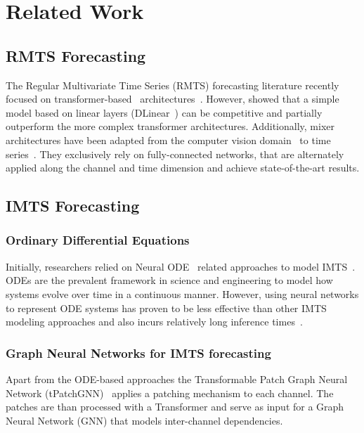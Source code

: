 \section{Related Work}
\subsection{RMTS Forecasting}
The Regular Multivariate Time Series (RMTS) forecasting literature recently focused on transformer-based~\cite{Vaswani2017.Attention} architectures~\cite{Zhou2021.Informer, Wu2021.Autoformer,Zhou2022.FEDformer,Nie2022.Time,Liu2023.ITransformer}. 
However, \citeauthor{Zeng2023.Are} showed that a simple model based on linear layers (DLinear~\cite{Zeng2023.Are}) can be competitive and partially outperform the more complex transformer architectures. 
Additionally, mixer architectures have been adapted from the computer vision domain~\cite{Tolstikhin2021.MLPMixer} to time series~\cite{Ekambaram2023.TSMixer,Chen2023.TSMixer}.
They exclusively rely on fully-connected networks, that are alternately applied along the channel and time dimension and achieve state-of-the-art results. 

\subsection{IMTS Forecasting}
\subsubsection{Ordinary Differential Equations}
Initially, researchers relied on Neural ODE~\cite{Chen2018.Neural} related approaches to model IMTS~\cite{Rubanova2019.Latent, DeBrouwer2019.GRUODEBayes,Bilos2021.Neural,Schirmer2022.Modeling}. 
ODEs are the prevalent framework in science and engineering to model how systems evolve over time in a continuous manner. 
However, using neural networks to represent ODE systems has proven to be less effective than other IMTS modeling approaches and also incurs relatively long inference times~\cite{Yalavarthi2023.Forecasting,Zhang.Irregular}. 

\subsubsection{Graph Neural Networks for IMTS forecasting}
Apart from the ODE-based approaches the Transformable Patch Graph Neural Network (tPatchGNN)~\cite{Zhang.Irregular} applies a patching mechanism to each channel. 
The patches are than processed with a Transformer and serve as input for a Graph Neural Network (GNN) that models inter-channel dependencies. 

